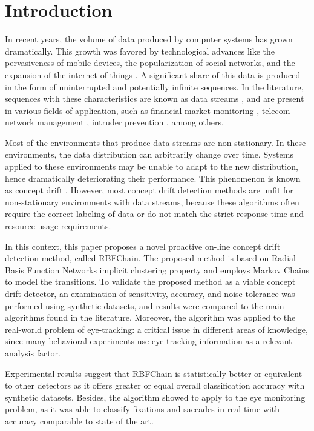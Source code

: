 \documentclass[preprint,12pt]{elsarticle}
\begin{document}
\section{Introduction}
\label{sec:intro}
In recent years,
the volume of data produced by computer systems has grown dramatically.
This growth was favored by technological advances like
the pervasiveness of mobile devices,
the popularization of social networks, and
the expansion of the internet of things \cite{Cohen:BigData:2009:MSN:1687553.1687576}.
%
A significant share of this data is produced in the form of uninterrupted and potentially infinite sequences.
In the literature,
sequences with these characteristics are known as data streams \cite{Aggarwal:2006:DSM:1196418},
and are present in various fields of application,
such as financial market monitoring  \cite{ZHOU:2015},
telecom network management \cite{delattre2015method},
 intruder prevention \cite{KENKRE:PAI:COLACO:2015},
 among others.

Most of the environments that produce data streams are non-stationary.
In these environments, the data distribution can arbitrarily change over time.
Systems applied to these environments may be unable to adapt to the new distribution, hence dramatically deteriorating their performance.
This phenomenon is known as concept drift \cite{Gama:2014:DAF:2670967.2670971}.
%
However, most concept drift detection methods are unfit for non-stationary environments with data streams,
because these algorithms often require the correct labeling of data or do not match the strict response time and resource usage requirements.

In this context, this paper proposes a novel proactive on-line concept drift detection method, called RBFChain.
The proposed method is based on Radial Basis Function Networks implicit clustering property
and employs Markov Chains to model the transitions.
To validate the proposed method as a viable concept drift detector,
an examination of sensitivity, accuracy,
and noise tolerance was performed using synthetic datasets,
and results were compared to the main algorithms found in the literature.
%
Moreover, the algorithm was applied to the real-world problem of eye-tracking: a critical issue in different areas of knowledge,
since many behavioral experiments use eye-tracking information as a relevant analysis factor.

Experimental results suggest that RBFChain is statistically better or equivalent to other detectors as it offers greater or equal overall classification accuracy with synthetic datasets.
Besides, the algorithm showed to apply to the eye monitoring problem, as it was able to classify fixations and saccades in real-time with accuracy comparable to state of the art.
\end{document}
